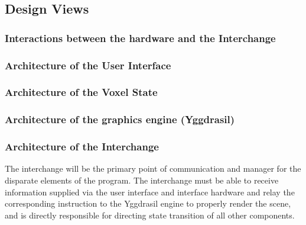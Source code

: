 \documentclass[onecolumn, draftclsnofoot,10pt, compsoc]{IEEEtran}
\begin{document}
\subsection{Design Views}

\subsubsection{Interactions between the hardware and the Interchange}

\subsubsection{Architecture of the User Interface}

\subsubsection{Architecture of the Voxel State}

\subsubsection{Architecture of the graphics engine (Yggdrasil)}

\subsubsection{Architecture of the Interchange}
The interchange will be the primary point of communication and manager for the disparate elements of the program. The interchange must be able to receive information supplied via the user interface and interface hardware and relay the corresponding instruction to the Yggdrasil engine to properly render the scene, and is directly responsible for directing state transition of all other components.
\end{document}
